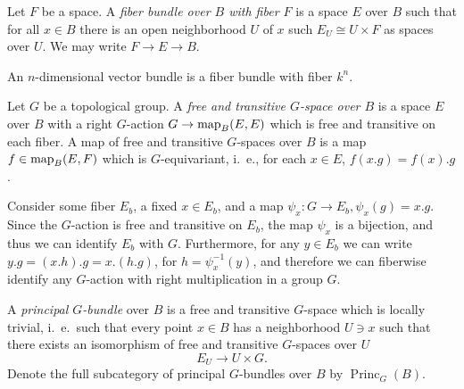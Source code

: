 \documentclass[a4paper,openany]{scrbook}
\DeclareMathOperator{\Princ}{Princ}
\begin{document}
\begin{defn}
	Let $F$ be a space. A \emph{fiber bundle over $B$ with fiber $F$} is a space $E$ over $B$ such that for all $x\in B$ there is an open neighborhood $U$ of $x$ such $E_U \cong U \times F$ as spaces over $U$. We may write $F \to E \to B$.
\end{defn}	

\begin{example}
	An $n$-dimensional vector bundle is a fiber bundle with fiber $k^n$.
\end{example}	

\begin{defn}
  Let $G$ be a topological group. A \emph{free and transitive $G$-space over $B$} is a space $E$ over $B$ with a right $G$-action $G \to \operatorname{map}_B(E,E)$ which is free and transitive on each fiber. A map of free and transitive $G$-spaces over $B$ is a map $f\in\operatorname{map}_B(E,F)$ which is $G$-equivariant, i.~e., for each $x \in E$, $f  (x.g) = f(x).g$. 

Consider some fiber $E_b$, a fixed $x \in E_b$, and a map $\psi_x\colon G \to E_b, \psi_x(g) = x.g$. Since the $G$-action is free and transitive on $E_b$, the map $\psi_x$ is a bijection, and thus we can identify $E_b$ with $G$. Furthermore, for any $y \in E_b$ we can write $y.g = (x.h).g=x.(h.g)$, for $h=\psi_x^{-1}(y)$, and therefore we can fiberwise identify any $G$-action with right multiplication in a group $G$.

A \emph{principal $G$-bundle} over $B$ is a free and transitive $G$-space which is locally trivial, i.~e.\ such that every point $x \in B$ has a neighborhood $U \ni x$ such that there exists an isomorphism of free and transitive $G$-spaces over $U$
\[
E_U \to U \times G.
\]
Denote the full subcategory of principal $G$-bundles over $B$ by $\Princ_G(B)$.
\end{defn}
\end{document}

